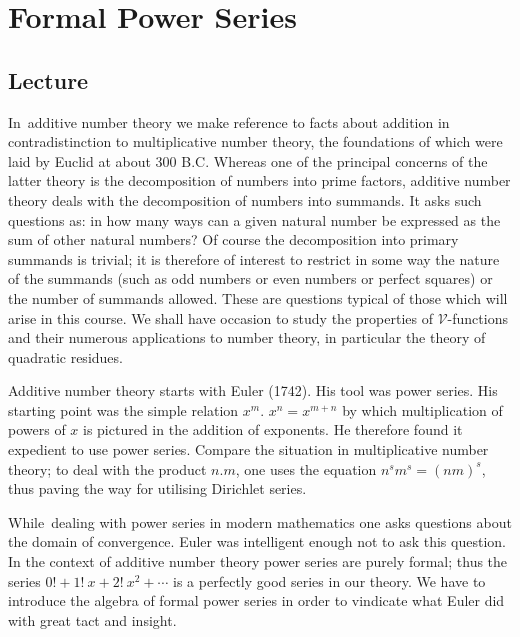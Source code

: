 \part{Formal Power Series}\label{part1}

\chapter{Lecture}\label{part1:lec1}



In\pageoriginale\  additive number theory we make reference to facts about addition in
contradistinction to multiplicative number theory, the foundations of
which were laid by Euclid at about 300 B.C. Whereas one of the
principal concerns of the latter theory is the decomposition of
numbers into prime factors, additive number theory deals with the
decomposition of numbers into summands. It asks such questions as: in
how many ways can a given natural number be expressed as the sum of
other natural numbers? Of course the decomposition into primary
summands is trivial; it is therefore of interest to restrict in some
way the nature of the summands (such as odd numbers or even numbers or
perfect squares) or the number of summands allowed. These are
questions typical of those which will arise in this course. We shall
have occasion to study the properties of $\mathcal{V}$-functions and
their numerous applications to number theory, in particular the theory
of quadratic residues.


Additive number theory starts with Euler (1742). His tool was power
series. His starting point was the simple relation $x^m$. $x^n= x^{m+n}$
by which multiplication of powers of $x$ is pictured in the addition
of exponents. He therefore found it expedient to use power
series. Compare the situation in multiplicative number theory; to deal
with the product $n. m$, one uses the equation $n^s m^s= (nm)^s$,
thus paving the way for utilising Dirichlet series.

While\pageoriginale\  dealing with power series in modern mathematics one asks
questions about the domain of convergence. Euler was intelligent
enough not to ask this question. In the context of additive number
theory power series are purely formal; thus the series $0!+ 1! ~x+2!~
x^2 + \cdots$ is a perfectly good series in our theory. We have to
introduce the algebra of formal power series in order to vindicate
what Euler did with great tact and insight.

